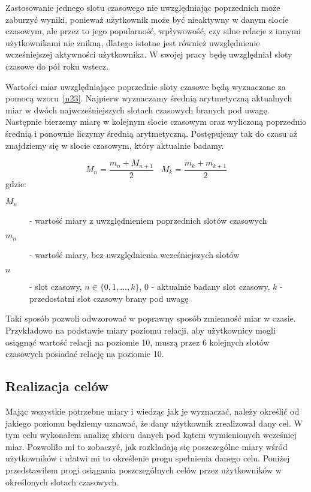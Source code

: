\documentclass[polish,12pt]{aghthesis}
\begin{document}
Zastosowanie jednego slotu czasowego nie uwzględniając poprzednich może zaburzyć wyniki, ponieważ użytkownik może być nieaktywny w danym slocie czasowym, ale przez to jego popularność, wpływowość, czy silne relacje z innymi użytkownikami nie znikną, dlatego istotne jest również uwzględnienie wcześniejszej aktywności użytkownika. W swojej pracy będę uwzględniał sloty czasowe do pół roku wstecz.


Wartości miar uwzględniające poprzednie sloty czasowe będą wyznaczane za pomocą wzoru~\ref{n23}. Najpierw wyznaczamy średnią arytmetyczną aktualnych miar w dwóch najwcześniejszych slotach czasowych branych pod uwagę. Następnie bierzemy miarę w kolejnym slocie czasowym oraz wyliczoną poprzednio średnią i ponownie liczymy średnią arytmetyczną. Postępujemy tak do czasu aż znajdziemy się w slocie czasowym, który aktualnie badamy.

\begin{equation}
    M_n = \frac{m_n + M_{n+1}}{2} \; \; \; M_k = \frac{m_k + m_{k+1}}{2}  \label{n23}
\end{equation}
gdzie:
\begin{description}
\item[$M_n$] - wartość miary z uwzględnieniem poprzednich slotów czasowych
\item[$m_n$] - wartość miary, bez uwzględnienia wcześniejszych slotów
\item[$n$] - slot czasowy, $n \in \{0, 1, ..., k\}$, 0 - aktualnie badany slot czasowy, $k$ - przedostatni slot czasowy brany pod uwagę

\end{description}

Taki sposób pozwoli odwzorować w poprawny sposób zmienność miar w czasie. Przykładowo na podstawie miary poziomu relacji, aby użytkownicy mogli osiągnąć wartość relacji na poziomie 10, muszą przez 6 kolejnych slotów czasowych posiadać relację na poziomie 10.

\subsection{Realizacja celów}

Mając wszystkie potrzebne miary i wiedząc jak je wyznaczać, należy określić od jakiego poziomu będziemy uznawać, że dany użytkownik zrealizował dany cel. W tym celu wykonałem analizę zbioru danych pod kątem wymienionych wcześniej miar. Pozwoliło mi to zobaczyć, jak rozkładają się poszczególne miary wśród użytkowników i ułatwi mi to określenie progu spełnienia danego celu. Poniżej przedstawiłem progi osiągania poszczególnych celów przez użytkowników w określonych slotach czasowych.
\end{document}
